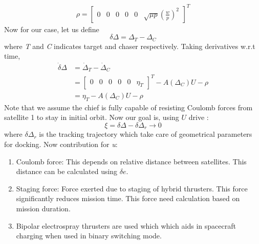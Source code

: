\documentclass[]{article}
\theoremstyle{remark}
\theoremstyle{definition}
\begin{document}
	\begin{align}
		\rho = \begin{bmatrix} 0 & 0 & 0 &0& 0 & \sqrt{\mu p}\left(\frac{w}{p}\right)^2 \end{bmatrix}^T
	\end{align}
	\newline
	Now for our case, let us define 
	\begin{equation}
		\delta \Delta = \Delta_T-\Delta_C
	\end{equation}
	where \textit{T} and \textit{C} indicates target and chaser respectively. Taking derivatives w.r.t time,
	\begin{align}
		\dot \delta \Delta &= \dot \Delta_T - \dot \Delta_C \\
		&= \begin{bmatrix} 0&0&0&0&0&\eta_T
		\end{bmatrix}^T - A(\Delta_C)U-\rho\\
		& = \eta_T -  A(\Delta_C)U-\rho
	\end{align}
	Note that we assume the chief is fully capable of resisting Coulomb forces from satellite 1 to stay in initial orbit. \newline
	Now our goal is, using $U$ drive :
	\[
	\xi = \delta \Delta-\delta \Delta_r \to 0
	\]
	where $\delta \Delta_r$ is the tracking trajectory which take care of geometrical parameters for docking. \newline 
	Now contribution for \textit{u}:
	\begin{enumerate}
		\item Coulomb force: This depends on relative distance between satellites. This distance can be calculated using $\delta e$. 
		\item Staging force: Force exerted due to staging of hybrid thrusters. This force significantly reduces mission time. This force need calculation based on mission duration.
		\item Bipolar electrospray thrusters are used which which aids in spacecraft charging when used in binary switching mode.
	\end{enumerate}
\end{document}
